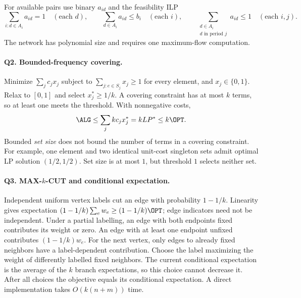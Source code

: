 For available pairs use binary $a_{id}$ and the feasibility ILP
\[
\sum_{i:d\in A_i}a_{id}=1\quad(\text{each }d),\qquad
\sum_{d\in A_i}a_{id}\le b_i\quad(\text{each }i),\qquad
\sum_{\substack{d\in A_i\\d\text{ in period }j}}a_{id}\le1
\quad(\text{each }i,j).
\]
The network has polynomial size and requires one maximum-flow computation.

\paragraph{Q2. Bounded-frequency covering.}
Minimize $\sum_j c_jx_j$ subject to
$\sum_{j:e\in S_j}x_j\ge1$ for every element, and $x_j\in\{0,1\}$.
Relax to $[0,1]$ and select $x_j^*\ge1/k$.  A covering constraint has at
most $k$ terms, so at least one meets the threshold.  With nonnegative costs,
\[
\ALG\le\sum_j kc_jx_j^*=kLP^*\le k\OPT.
\]
Bounded \emph{set size} does not bound the number of terms in a covering
constraint.  For example, one element and two identical unit-cost singleton
sets admit optimal LP solution $(1/2,1/2)$.  Set size is at most $1$, but
threshold $1$ selects neither set.

\paragraph{Q3. \texorpdfstring{MAX-$k$-CUT}{MAX-k-CUT} and conditional expectation.}
Independent uniform vertex labels cut an edge with probability $1-1/k$.
Linearity gives expectation $(1-1/k)\sum_e w_e\ge(1-1/k)\OPT$; edge
indicators need not be independent.  Under a partial labelling, an edge
with both endpoints fixed contributes its weight or zero.  An edge with
at least one endpoint unfixed contributes $(1-1/k)w_e$.  For the next
vertex, only edges to already fixed neighbors have a label-dependent
contribution.  Choose the label maximizing the weight of differently
labelled fixed neighbors.  The current conditional expectation is the
average of the $k$ branch expectations, so this choice cannot decrease it.
After all choices the objective equals its conditional expectation.
A direct implementation takes $O(k(n+m))$ time.

